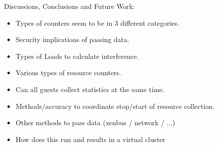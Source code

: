 Discussions, Conclusions and Future Work:

\begin{itemize}
\item Types of counters seem to be in 3 different categories.
\item Security implications of passing data.
\item Types of Loads to calculate interference.
\item Various types of resource counters.
\item Can all guests collect statistics at the same time.
\item Methods/accuracy to coordinate stop/start of resource collection.
\item Other methods to pass data (xenbus / network / ...)
\item How does this run and results in a virtual cluster
\end{itemize}
